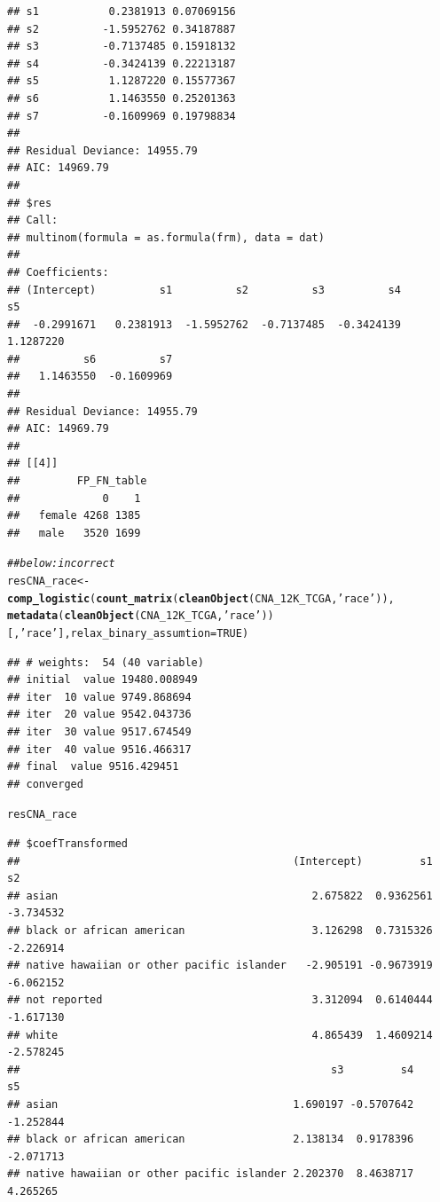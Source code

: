 \documentclass{article}\usepackage[]{graphicx}\usepackage[]{color}
\makeatletter
\newcommand{\hlnum}[1]{\textcolor[rgb]{0.686,0.059,0.569}{#1}}%
\newcommand{\hlstr}[1]{\textcolor[rgb]{0.192,0.494,0.8}{#1}}%
\newcommand{\hlcom}[1]{\textcolor[rgb]{0.678,0.584,0.686}{\textit{#1}}}%
\newcommand{\hlstd}[1]{\textcolor[rgb]{0.345,0.345,0.345}{#1}}%
\newcommand{\hlkwb}[1]{\textcolor[rgb]{0.69,0.353,0.396}{#1}}%
\newcommand{\hlkwc}[1]{\textcolor[rgb]{0.333,0.667,0.333}{#1}}%
\newcommand{\hlkwd}[1]{\textcolor[rgb]{0.737,0.353,0.396}{\textbf{#1}}}%
\newenvironment{kframe}{%
 \def\at@end@of@kframe{}%
 \ifinner\ifhmode%
  \def\at@end@of@kframe{\end{minipage}}%
  \begin{minipage}{\columnwidth}%
 \fi\fi%
 \def\FrameCommand##1{\hskip\@totalleftmargin \hskip-\fboxsep
 \colorbox{shadecolor}{##1}\hskip-\fboxsep
     \hskip-\linewidth \hskip-\@totalleftmargin \hskip\columnwidth}%
 \MakeFramed {\advance\hsize-\width
   \@totalleftmargin\z@ \linewidth\hsize
   \@setminipage}}%
 {\par\unskip\endMakeFramed%
 \at@end@of@kframe}
\newenvironment{knitrout}{}{} %
\makeatother
\begin{document}
\begin{knitrout}
\begin{kframe}
\begin{verbatim}
## s1           0.2381913 0.07069156
## s2          -1.5952762 0.34187887
## s3          -0.7137485 0.15918132
## s4          -0.3424139 0.22213187
## s5           1.1287220 0.15577367
## s6           1.1463550 0.25201363
## s7          -0.1609969 0.19798834
## 
## Residual Deviance: 14955.79 
## AIC: 14969.79 
## 
## $res
## Call:
## multinom(formula = as.formula(frm), data = dat)
## 
## Coefficients:
## (Intercept)          s1          s2          s3          s4          s5 
##  -0.2991671   0.2381913  -1.5952762  -0.7137485  -0.3424139   1.1287220 
##          s6          s7 
##   1.1463550  -0.1609969 
## 
## Residual Deviance: 14955.79 
## AIC: 14969.79 
## 
## [[4]]
##         FP_FN_table
##             0    1
##   female 4268 1385
##   male   3520 1699
\end{verbatim}
\begin{alltt}
\hlcom{## below: incorrect}
\hlstd{resCNA_race} \hlkwb{<-} \hlkwd{comp_logistic}\hlstd{(}\hlkwd{count_matrix}\hlstd{(}\hlkwd{cleanObject}\hlstd{(CNA_12K_TCGA,} \hlstr{'race'}\hlstd{)),}
                              \hlkwd{metadata}\hlstd{(}\hlkwd{cleanObject}\hlstd{(CNA_12K_TCGA,} \hlstr{'race'}\hlstd{))[,}\hlstr{'race'}\hlstd{],} \hlkwc{relax_binary_assumtion} \hlstd{=} \hlnum{TRUE}\hlstd{)}
\end{alltt}
\begin{verbatim}
## # weights:  54 (40 variable)
## initial  value 19480.008949 
## iter  10 value 9749.868694
## iter  20 value 9542.043736
## iter  30 value 9517.674549
## iter  40 value 9516.466317
## final  value 9516.429451 
## converged
\end{verbatim}
\begin{alltt}
\hlstd{resCNA_race}
\end{alltt}
\begin{verbatim}
## $coefTransformed
##                                           (Intercept)         s1        s2
## asian                                        2.675822  0.9362561 -3.734532
## black or african american                    3.126298  0.7315326 -2.226914
## native hawaiian or other pacific islander   -2.905191 -0.9673919 -6.062152
## not reported                                 3.312094  0.6140444 -1.617130
## white                                        4.865439  1.4609214 -2.578245
##                                                 s3         s4        s5
## asian                                     1.690197 -0.5707642 -1.252844
## black or african american                 2.138134  0.9178396 -2.071713
## native hawaiian or other pacific islander 2.202370  8.4638717  4.265265

\end{verbatim}
\end{kframe}
\end{knitrout}
\end{document}
